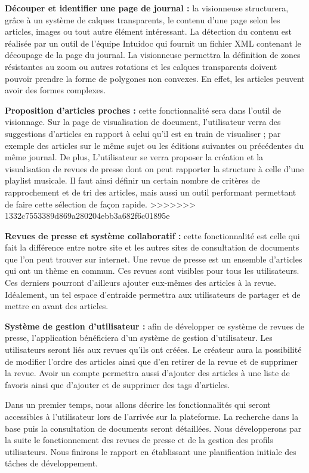     \textbf{Découper et identifier une page de journal :} la visionneuse structurera, grâce à un système de calques transparents, le contenu d’une page selon
    les articles, images ou tout autre élément intéressant. La détection du contenu est réalisée par un outil de l’équipe Intuidoc qui fournit un
    fichier XML contenant le découpage de la page du journal. La visionneuse permettra la définition de zones résistantes au zoom ou autres
    rotations et les calques transparents doivent pouvoir prendre la forme de polygones non convexes. En effet, les articles peuvent avoir des formes complexes.


    \textbf{Proposition d’articles proches :} cette fonctionnalité sera dans l’outil de visionnage. Sur la page de visualisation de document, l'utilisateur verra des suggestions d'articles en rapport à celui qu'il est en train de visualiser ; par exemple des articles sur le même sujet ou les éditions suivantes ou précédentes
    du même journal. De plus, L'utilisateur se verra proposer la création et la visualisation de revues de presse dont on peut rapporter la structure
    à celle d’une playlist musicale. Il faut ainsi définir un certain nombre de critères de rapprochement et de tri des articles, mais aussi un outil performant permettant de faire cette sélection de façon rapide.
>>>>>>> 1332c7553389d869a280204ebb3a682f6c01895e

    \textbf{Revues de presse et système collaboratif :} cette fonctionnalité est celle qui fait la différence entre notre site et les autres sites de consultation de documents que l'on peut trouver sur internet. Une revue de presse est un ensemble d'articles qui ont un thème en commun. Ces revues sont visibles pour tous les utilisateurs. Ces derniers pourront d'ailleurs ajouter eux-mêmes des articles à la revue. Idéalement, un tel espace d’entraide permettra aux utilisateurs de partager et de mettre en avant des articles.
		
		\textbf{Système de gestion d'utilisateur :} afin de développer ce système de revues de presse, l’application bénéficiera d’un système de gestion d’utilisateur. Les utilisateurs seront liés aux revues qu’ils ont créées. Le créateur aura la possibilité de modifier l'ordre des articles ainsi que d'en retirer de la revue et de supprimer la revue. Avoir un compte permettra aussi d'ajouter des articles à une liste de favoris ainsi que d'ajouter et de supprimer des tags d'articles.

    Dans un premier temps, nous allons décrire les fonctionnalités qui seront accessibles à l'utilisateur lors de l'arrivée sur la plateforme. La recherche dans la base puis la consultation de documents seront détaillées. Nous développerons par la suite le fonctionnement des revues de presse et de la gestion des profils utilisateurs. Nous finirons le rapport en établissant une planification initiale des tâches de développement.